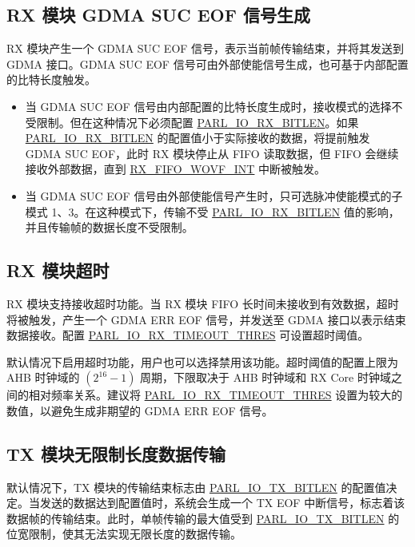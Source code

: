 \documentclass[main\_\_CN.tex]{subfiles}
\begin{document}
\subsection{RX 模块 GDMA SUC EOF 信号生成}

RX 模块产生一个 GDMA SUC EOF 信号，表示当前帧传输结束，并将其发送到 GDMA 接口。GDMA SUC EOF 信号可由外部使能信号生成，也可基于内部配置的比特长度触发。

\begin{itemize}
    \item 当 GDMA SUC EOF 信号由内部配置的比特长度生成时，接收模式的选择不受限制。但在这种情况下必须配置 \hyperref[fielddesc:PARLIORXBITLEN]{PARL\_IO\_RX\_BITLEN}。如果 \hyperref[fielddesc:PARLIORXBITLEN]{PARL\_IO\_RX\_BITLEN} 的配置值小于实际接收的数据，将提前触发 GDMA SUC EOF，此时 RX 模块停止从 FIFO 读取数据，但 FIFO 会继续接收外部数据，直到 \hyperref[int:RXFIFOWOVFINT]{RX\_FIFO\_WOVF\_INT} 中断被触发。
    \item 当 GDMA SUC EOF 信号由外部使能信号产生时，只可选脉冲使能模式的子模式 1、3。在这种模式下，传输不受 \hyperref[fielddesc:PARLIORXBITLEN]{PARL\_IO\_RX\_BITLEN} 值的影响，并且传输帧的数据长度不受限制。
\end{itemize}

\subsection{RX 模块超时}

RX 模块支持接收超时功能。当 RX 模块 FIFO 长时间未接收到有效数据，超时将被触发，产生一个 GDMA ERR EOF 信号，并发送至 GDMA 接口以表示结束数据接收。配置 \hyperref[fielddesc:PARLIORXTIMEOUTTHRES] {PARL\_IO\_RX\_TIMEOUT\_THRES} 可设置超时阈值。

默认情况下启用超时功能，用户也可以选择禁用该功能。超时阈值的配置上限为 AHB 时钟域的 \begin{math} (2^{16}-1) \end{math} 周期，下限取决于 AHB 时钟域和 RX Core 时钟域之间的相对频率关系。建议将 \hyperref[fielddesc:PARLIORXTIMEOUTTHRES] {PARL\_IO\_RX\_TIMEOUT\_THRES} 设置为较大的数值，以避免生成非期望的 GDMA ERR EOF 信号。

\subsection{TX 模块无限制长度数据传输}

默认情况下，TX 模块的传输结束标志由 \hyperref[fielddesc:PARLIOTXBITLEN]{PARL\_IO\_TX\_BITLEN} 的配置值决定。当发送的数据达到配置值时，系统会生成一个 TX EOF 中断信号，标志着该数据帧的传输结束。此时，单帧传输的最大值受到 \hyperref[fielddesc:PARLIOTXBITLEN]{PARL\_IO\_TX\_BITLEN} 的位宽限制，使其无法实现无限长度的数据传输。
\end{document}
